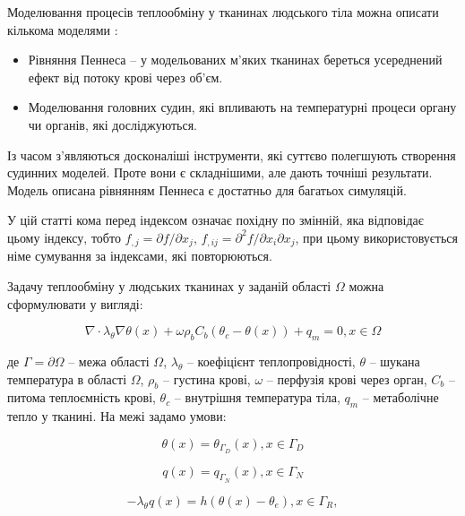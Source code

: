 Моделювання процесів теплообміну у тканинах людського тіла можна описати кількома моделями
\cite{kutz-zhu-heat-transfer-biological-systems}:
\begin{itemize}
  \item Рівняння Пеннеса\cite{thermal-process-tissue-pennes} -- у модельованих м'яких тканинах береться усереднений
        ефект від потоку крові через об'єм.
  \item Моделювання головних судин, які впливають на температурні процеси органу чи органів, які досліджуються.
\end{itemize}
Із часом з'являються досконаліші інструменти, які суттєво полегшують створення судинних моделей. Проте вони є
складнішими, але дають точніші результати. Модель описана рівнянням Пеннеса є достатньо для багатьох симуляцій.

У цій статті кома перед індексом означає похідну по змінній, яка відповідає цьому індексу, тобто ${f_{,j} =
\partial}{f/\partial}x_{j}$, ${{f_{,ij} = \partial^{2}}{f/\partial}x_{i}\partial x_{j}}{}$, при цьому використовується
німе сумування за індексами, які повторюються.

Задачу теплообміну у людських тканинах у заданій області $\Omega$ можна сформулювати у вигляді:

\begin{equation}
  \label{eqn:theory_thermo_pennes_eqn}
  \nabla \cdot \lambda_\theta \nabla \theta(x) + \omega \rho_b C_b (\theta_c - \theta(x)) + q_m  = 0, x \in \Omega
\end{equation}

\noindent де $\Gamma = \partial \Omega$ -- межа області $\Omega$, $\lambda_\theta$ -- коефіцієнт теплопровідності,
$\theta$ -- шукана температура в області $\Omega$,
$\rho_b$ -- густина крові, $\omega$ -- перфузія крові через орган, $C_b$ -- питома теплоємність крові,
$\theta_c$ -- внутрішня температура тіла, $q_m$ -- метаболічне тепло у тканині. На межі задамо умови:

\begin{equation}
  \label{eqn:theory_thermo_cond_dirichlet}
  \theta(x) = \theta_{\Gamma_D}(x), x \in \Gamma_D
\end{equation}

\begin{equation}
  \label{eqn:theory_thermo_cond_neumann}
  q(x) = q_{\Gamma_N}(x), x \in \Gamma_N
\end{equation}

\begin{equation}
  \label{eqn:theory_thermo_cond_robin}
  -\lambda_\theta q(x) = h(\theta(x) - \theta_e), x \in \Gamma_R,
\end{equation}

